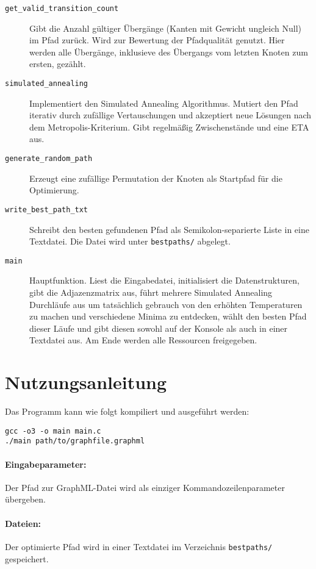 \documentclass{article}
\begin{document}
\begin{description}
    \item[\texttt{get\_valid\_transition\_count}] Gibt die Anzahl gültiger Übergänge (Kanten mit Gewicht ungleich Null) im Pfad zurück. Wird zur Bewertung der Pfadqualität genutzt. Hier werden alle Übergänge, inklusieve des Übergangs vom letzten Knoten zum ersten, gezählt.
    \item[\texttt{simulated\_annealing}] Implementiert den Simulated Annealing Algorithmus. Mutiert den Pfad iterativ durch zufällige Vertauschungen und akzeptiert neue Lösungen nach dem Metropolis-Kriterium. Gibt regelmäßig Zwischenstände und eine ETA aus.
    \item[\texttt{generate\_random\_path}] Erzeugt eine zufällige Permutation der Knoten als Startpfad für die Optimierung.
    \item[\texttt{write\_best\_path\_txt}] Schreibt den besten gefundenen Pfad als Semikolon-separierte Liste in eine Textdatei. Die Datei wird unter \texttt{bestpaths/} abgelegt.
    \item[\texttt{main}] Hauptfunktion. Liest die Eingabedatei, initialisiert die Datenstrukturen, gibt die Adjazenzmatrix aus, führt mehrere Simulated Annealing Durchläufe aus um tatsächlich gebrauch von den erhöhten Temperaturen zu machen und verschiedene Minima zu entdecken, wählt den besten Pfad dieser Läufe und gibt diesen sowohl auf der Konsole als auch in einer Textdatei aus. Am Ende werden alle Ressourcen freigegeben.
\end{description}

\section*{Nutzungsanleitung}

Das Programm kann wie folgt kompiliert und ausgeführt werden:

\begin{verbatim}
gcc -o3 -o main main.c
./main path/to/graphfile.graphml
\end{verbatim}

\paragraph*{Eingabeparameter:}
Der Pfad zur GraphML-Datei wird als einziger Kommandozeilenparameter übergeben.

\paragraph*{Dateien:}
Der optimierte Pfad wird in einer Textdatei im Verzeichnis \texttt{bestpaths/} gespeichert.
\end{document}
